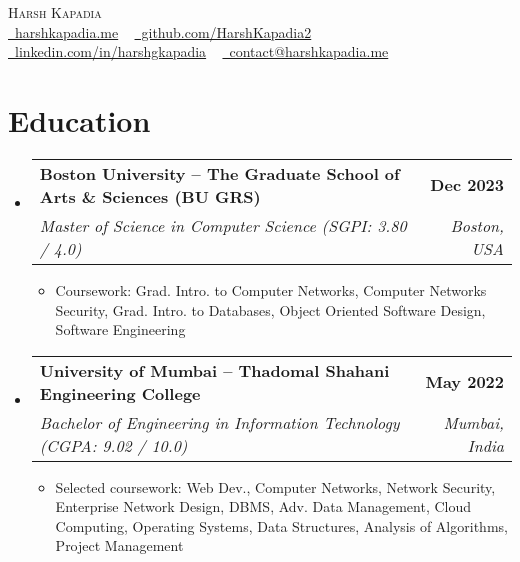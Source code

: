 \documentclass[letterpaper,11pt]{article}
\makeatletter
\newcommand{\resumeItem}[1]{
  \item\small{
    {#1 \vspace{-2pt}}
  }
}
\newcommand{\resumeSubheading}[4]{
  \vspace{-2pt}\item
    \begin{tabular*}{1.0\textwidth}[t]{l@{\extracolsep{\fill}}r}
      \vspace{-2pt}\textbf{#1} & \textbf{\small #2} \\
      \textit{\small#3} & \textit{\small #4} \\
    \end{tabular*}\vspace{-7pt}
}
\newcommand{\resumeSubHeadingListStart}{\begin{itemize}[leftmargin=0.0in, label={}]}
\newcommand{\resumeSubHeadingListEnd}{\end{itemize}}
\newcommand{\resumeItemListStart}{\begin{itemize}}
\newcommand{\resumeItemListEnd}{\end{itemize}\vspace{-5pt}}
\makeatother
\begin{document}

\begin{center}
    {\huge \scshape Harsh Kapadia} \\ \vspace{1pt}
    \small
    \faGlobe \href{https://harshkapadia.me}{\raisebox{-0.1\height}\ harshkapadia.me} ~
    \faGithub \href{https://github.com/HarshKapadia2}{\raisebox{-0.2\height}\ github.com/HarshKapadia2} ~
    \faLinkedin \href{https://linkedin.com/in/harshgkapadia}{\raisebox{-0.2\height}\ linkedin.com/in/harshgkapadia} ~
    \faEnvelope \href{mailto:contact@harshkapadia.me}{\raisebox{-0.2\height}\  contact@harshkapadia.me}
    \vspace{-13pt}
\end{center}


\section{Education}
    \vspace{-2pt}
    \resumeSubHeadingListStart
        \resumeSubheading
            {Boston University -- The Graduate School of Arts \& Sciences (BU GRS)}{Dec 2023}
            {Master of Science in Computer Science (SGPI: 3.80 / 4.0)}{Boston, USA}
            \resumeItemListStart
                \resumeItem{Coursework: Grad. Intro. to Computer Networks, Computer Networks Security, Grad. Intro. to Databases, Object Oriented Software Design, Software Engineering}
            \resumeItemListEnd
        \vspace{-3pt}

        \resumeSubheading
            {University of Mumbai -- Thadomal Shahani Engineering College}{May 2022}
            {Bachelor of Engineering in Information Technology (CGPA: 9.02 / 10.0)}{Mumbai, India}
            \resumeItemListStart
                \resumeItem{Selected coursework: Web Dev., Computer Networks, Network Security, Enterprise Network Design, DBMS, Adv. Data Management, Cloud Computing, Operating Systems, Data Structures, Analysis of Algorithms, Project Management}
            \resumeItemListEnd
    \resumeSubHeadingListEnd
\vspace{-19pt}
\end{document}
